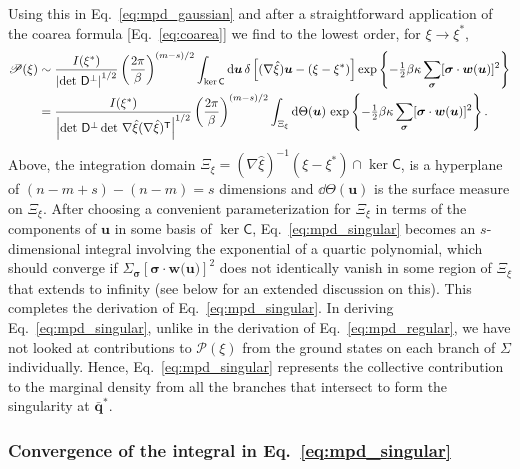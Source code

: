 %
Using this in Eq.~\eqref{eq:mpd_gaussian} and after a straightforward application of the coarea formula [Eq.~\eqref{eq:coarea}] we find to the lowest order, for $\xi \to \xi^{*}$,
%
\begin{equation}
  \begin{aligned}
    \mathscr{P}(\xi) &\sim \frac{I(\xi^{*})}{\left|\det\, \mathsf{D}^\perp\right|^{1/2}} \left(\frac{2\pi}{\beta}\right)^{(m-s)/2} \int_{\ker\mathsf{C}} \mathrm{d}\bm{u}\, \delta\left[(\nabla\hat{\xi})\bm{u} - (\xi - \xi^{*})\right] \exp\left\{-\tfrac{1}{2}\beta\kappa\sum_{\bm{\sigma}}[\bm{\sigma}\cdot \bm{w}(\bm{u})]^2\right\}\\
                                 &= \frac{I({\xi}^{*})}{\left|\det\, \mathsf{D}^\perp \det\, \nabla\hat{\xi}(\nabla\hat{\xi})^\mathsf{T}\right|^{1/2}}  \left(\frac{2\pi}{\beta}\right)^{(m-s)/2} \int_{\Xi_{\xi}} \mathrm{d}\Theta(\bm{u})\, \exp\left\{-\tfrac{1}{2}\beta\kappa\sum_{\bm{\sigma}}[\bm{\sigma}\cdot\bm{w}(\bm{u})]^2\right\}.
  \end{aligned}
  \label{eq:mpd_singular}
\end{equation}
%
Above, the integration domain $\Xi_{\xi} = (\nabla\hat{\xi})^{-1}(\xi - \xi^{*}) \cap \ker\mathsf{C}$, is a hyperplane of $(n - m + s) - (n - m) = s$ dimensions and $\dd\Theta(\bm{u})$ is the surface measure on $\Xi_{\xi}$.
After choosing a convenient parameterization for $\Xi_{\xi}$ in terms of the components of $\bm{u}$ in some basis of $\ker\mathsf{C}$, Eq.~\eqref{eq:mpd_singular} becomes an $s$-dimensional integral involving the exponential of a quartic polynomial, which should converge if $\Sigma_{\bm{\sigma}} [\bm{\sigma}\cdot\bm{w}(\bm{u)}]^2$ does not identically vanish in some region of $\Xi_{\xi}$ that extends to infinity (see below for an extended discussion on this).
This completes the derivation of Eq.~\eqref{eq:mpd_singular}.
In deriving Eq.~\eqref{eq:mpd_singular}, unlike in the derivation of Eq.~\eqref{eq:mpd_regular}, we have not looked at contributions to $\mathscr{P}(\xi)$ from the ground states on each branch of $\Sigma$ individually.
Hence, Eq.~\eqref{eq:mpd_singular} represents the collective contribution to the marginal density from all the branches that intersect to form the singularity at $\bar{\bm{q}}^{*}$.

\subsubsection*{Convergence of the integral in \texorpdfstring{Eq.~\eqref{eq:mpd_singular}}{Eq. (5)}}
\label{sec:convergence}

